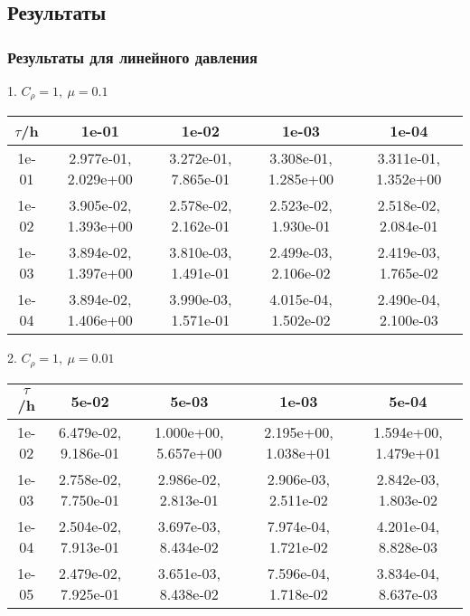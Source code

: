 \subsection{Результаты}
\subsubsection{Результаты для линейного давления}
1. $C_{\rho} = 1, \ \mu = 0.1$
\begin{center}
	\begin{tabular}{ |c|c|c|c|c| } 
		\hline
		$\tau$/h & 1e-01 & 1e-02 & 1e-03 & 1e-04 \\ 
		\hline
		1e-01 & 2.977e-01,  2.029e+00 & 3.272e-01,  7.865e-01 & 3.308e-01,  1.285e+00 & 3.311e-01,  1.352e+00\\ 
		\hline
		1e-02 & 3.905e-02,  1.393e+00 & 2.578e-02,  2.162e-01 & 2.523e-02,  1.930e-01 & 2.518e-02,  2.084e-01\\ 
		\hline
		1e-03 & 3.894e-02,  1.397e+00 & 3.810e-03,  1.491e-01 & 2.499e-03,  2.106e-02 & 2.419e-03,  1.765e-02\\ 
		\hline
		1e-04 & 3.894e-02,  1.406e+00 & 3.990e-03,  1.571e-01 & 4.015e-04,  1.502e-02 & 2.490e-04,  2.100e-03\\ 
		\hline
	\end{tabular}
\end{center}

2. $C_{\rho} = 1, \ \mu = 0.01$
\begin{center}
	\begin{tabular}{ |c|c|c|c|c| } 
		\hline
		$\tau$/h & 5e-02 & 5e-03 & 1e-03 & 5e-04 \\ 
		\hline
		1e-02 & 6.479e-02,  9.186e-01 & 1.000e+00,  5.657e+00 & 2.195e+00,  1.038e+01 & 1.594e+00,  1.479e+01\\ 
		\hline
		1e-03 & 2.758e-02,  7.750e-01 & 2.986e-02,  2.813e-01 & 2.906e-03,  2.511e-02 & 2.842e-03,  1.803e-02\\ 
		\hline
		1e-04 & 2.504e-02,  7.913e-01 & 3.697e-03,  8.434e-02 & 7.974e-04,  1.721e-02 & 4.201e-04,  8.828e-03\\ 
		\hline
		1e-05 & 2.479e-02,  7.925e-01 & 3.651e-03,  8.438e-02 & 7.596e-04,  1.718e-02 & 3.834e-04,  8.637e-03\\ 
		\hline
	\end{tabular}
\end{center}

